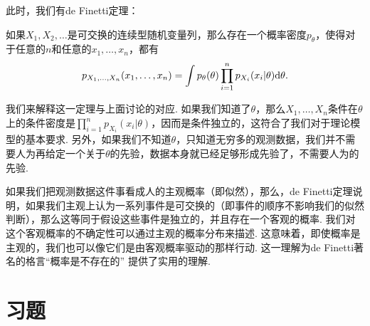 此时，我们有de Finetti定理：

\begin{theorem}[de Finetti定理]
    如果$X_1,X_2,\dots$是可交换的连续型随机变量列，那么存在一个概率密度$p_\theta$，使得对于任意的$n$和任意的$x_1,\dots,x_n$，都有
    \[
        p_{X_1,\dots,X_n}(x_1,\dots,x_n) = \int p_\theta(\theta)\prod_{i=1}^n p_{X_i}(x_i|\theta)\mathrm{d}\theta.
    \]
\end{theorem}

我们来解释这一定理与上面讨论的对应. 如果我们知道了$\theta$，那么$X_1,\dots,X_n$条件在$\theta$上的条件密度是$\prod_{i=1}^n p_{X_i}(x_i|\theta)$，因而是条件独立的，这符合了我们对于理论模型的基本要求. 另外，如果我们不知道$\theta$，只知道无穷多的观测数据，我们并不需要人为再给定一个关于$\theta$的先验，数据本身就已经足够形成先验了，不需要人为的先验. 

\begin{remark}
    如果我们把观测数据这件事看成人的主观概率（即似然），那么，de Finetti定理说明，如果我们主观上认为一系列事件是可交换的（即事件的顺序不影响我们的似然判断），那么这等同于假设这些事件是独立的，并且存在一个客观的概率. 我们对这个客观概率的不确定性可以通过主观的概率分布来描述. 这意味着，即使概率是主观的，我们也可以像它们是由客观概率驱动的那样行动. 这一理解为de Finetti著名的格言“概率是不存在的”\cite{spiegelhalterWhyProbabilityProbably2024} 提供了实用的理解.
\end{remark}

\section{习题}

